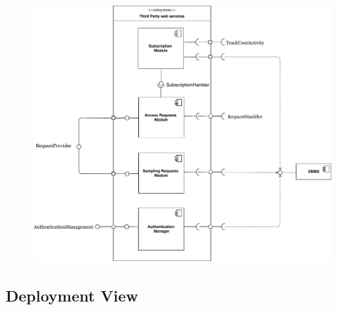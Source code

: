 \documentclass[12pt,a4paper]{article}
\begin{document}
	\begin{figure}[H]
		\centering
		\includegraphics[height=0.9\linewidth]{images/third_party_projection}
		\label{fig:third_party_projection}
	\end{figure}
	
	\newpage
	\subsection{Deployment View}
\end{document}
